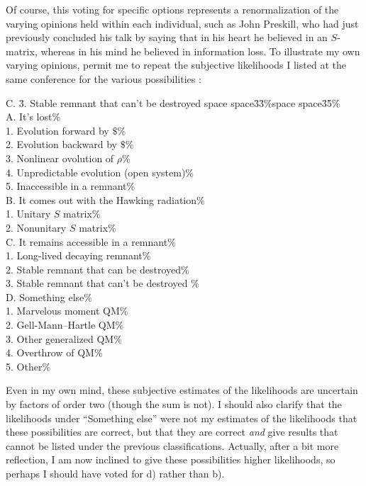 	Of course, this voting for specific options represents a
renormalization of
the varying opinions held within each individual, such as John
Preskill, who
had just previously concluded his talk \cite{PreSB} by saying that in
his
heart
he believed in an $S$-matrix, whereas in his mind he believed in
information
loss.  To illustrate my own varying opinions, permit me to repeat the
subjective
likelihoods I listed at the same conference for the various
possibilities
\cite{PagSB}:
\pagebreak
\begin{tabbing}
C. \= 3. Stable remnant that can't be destroyed space space\=
3\=3\%space space\=3\=5\%\kill
{}\hspace{25 mm}{\bf Personal
Estimate of
Likelihoods}\\
A. It's lost\>\%\+\\
 1. Evolution forward by $\$$\>\>\>\%\\
 2. Evolution backward by $\$$\>\>\>\%\\
 3. Nonlinear ovolution of $\rho$\>\>\>\%\\
 4. Unpredictable evolution (open system)\>\>\%\\
 5. Inaccessible in a remnant\>\>\>\%\-\\
 B. It comes out with the Hawking radiation\>\%\+\\
 1. Unitary $S$ matrix\>\>\%\\
 2. Nonunitary $S$ matrix\>\>\>\%\-\\
C. It remains accessible in a remnant\>\>\%\+\\
1. Long-lived decaying remnant\>\>\>\%\\
2. Stable remnant that can be destroyed\>\>\>\%\\
3. Stable remnant that can't be destroyed \>\>\>\%\-\\
D. Something else\>\%\+\\
1. Marvelous moment  QM\>\>\>\%\\
2. Gell-Mann--Hartle QM\>\>\>\%\\
3. Other generalized QM\>\>\%\\
4. Overthrow of QM\>\>\>\%\\
5. Other\>\>\>\%\\
\end{tabbing}

	Even in my own mind, these subjective estimates of the
likelihoods are
uncertain by factors of order two (though the sum is not).  I should
also
clarify
that the likelihoods under ``Something else'' were not my estimates
of the
likelihoods that these possibilities are correct, but that they are
correct
{\em and} give results that cannot be listed under the previous
classifications.
Actually, after a bit more reflection, I am now inclined to give
these
possibilities higher likelihoods, so perhaps I should have voted for
d) rather
than b).

